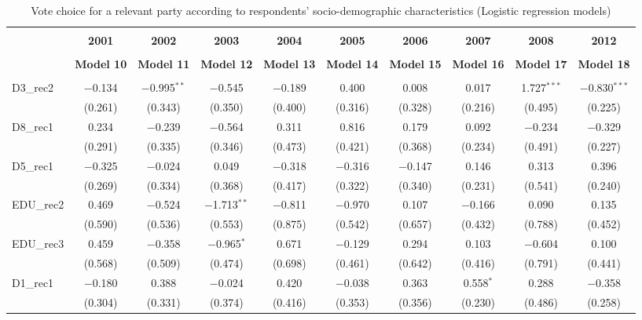 \documentclass[
]{article}
\begin{document}
\begin{table}[!htbp] \centering 
  \caption{Vote choice for a relevant party according to respondents' 
                       socio-demographic characteristics (Logistic regression models)} 
  \label{table:full_logit_nl} 
\begin{tabular}{@{\extracolsep{5pt}}lccccccccc} 
\\[-1.8ex]\hline \\[-1.8ex] 
 & \textbf{2001} & \textbf{2002} & \textbf{2003} & \textbf{2004} & \textbf{2005} & \textbf{2006} & \textbf{2007} & \textbf{2008} & \textbf{2012} \\ 
\\[-1.8ex] & \textbf{Model 10} & \textbf{Model 11} & \textbf{Model 12} & \textbf{Model 13} & \textbf{Model 14} & \textbf{Model 15} & \textbf{Model 16} & \textbf{Model 17} & \textbf{Model 18}\\ 
\hline \\[-1.8ex] 
 D3\_rec2 & $-$0.134 & $-$0.995$^{**}$ & $-$0.545 & $-$0.189 & 0.400 & 0.008 & 0.017 & 1.727$^{***}$ & $-$0.830$^{***}$ \\ 
  & (0.261) & (0.343) & (0.350) & (0.400) & (0.316) & (0.328) & (0.216) & (0.495) & (0.225) \\ 
  D8\_rec1 & 0.234 & $-$0.239 & $-$0.564 & 0.311 & 0.816 & 0.179 & 0.092 & $-$0.234 & $-$0.329 \\ 
  & (0.291) & (0.335) & (0.346) & (0.473) & (0.421) & (0.368) & (0.234) & (0.491) & (0.227) \\ 
  D5\_rec1 & $-$0.325 & $-$0.024 & 0.049 & $-$0.318 & $-$0.316 & $-$0.147 & 0.146 & 0.313 & 0.396 \\ 
  & (0.269) & (0.334) & (0.368) & (0.417) & (0.322) & (0.340) & (0.231) & (0.541) & (0.240) \\ 
  EDU\_rec2 & 0.469 & $-$0.524 & $-$1.713$^{**}$ & $-$0.811 & $-$0.970 & 0.107 & $-$0.166 & 0.090 & 0.135 \\ 
  & (0.590) & (0.536) & (0.553) & (0.875) & (0.542) & (0.657) & (0.432) & (0.788) & (0.452) \\ 
  EDU\_rec3 & 0.459 & $-$0.358 & $-$0.965$^{*}$ & 0.671 & $-$0.129 & 0.294 & 0.103 & $-$0.604 & 0.100 \\ 
  & (0.568) & (0.509) & (0.474) & (0.698) & (0.461) & (0.642) & (0.416) & (0.791) & (0.441) \\ 
  D1\_rec1 & $-$0.180 & 0.388 & $-$0.024 & 0.420 & $-$0.038 & 0.363 & 0.558$^{*}$ & 0.288 & $-$0.358 \\ 
  & (0.304) & (0.331) & (0.374) & (0.416) & (0.353) & (0.356) & (0.230) & (0.486) & (0.258) \\ 

\end{tabular}
\end{table}
\end{document}

